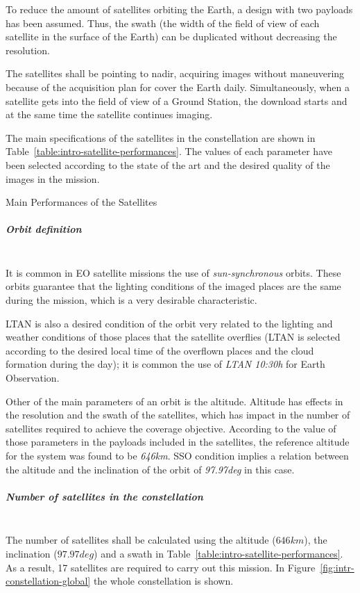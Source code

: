 To reduce the amount of satellites orbiting the Earth, a design with two payloads has been assumed. Thus, the swath (the width of the field of view of each satellite in the surface of the Earth) can be duplicated without decreasing the resolution.

The satellites shall be pointing to nadir, acquiring images without maneuvering because of the acquisition plan for cover the Earth daily. Simultaneously, when a satellite gets into the field of view of a Ground Station, the download starts and at the same time the satellite continues imaging.

The main specifications of the satellites in the constellation are shown in Table~\ref{table:intro-satellite-performances}. The values of each parameter have been selected according to the state of the art and the desired quality of the images in the mission.

\begin{table}[hp]
  \centering
  {\small
  
  }
  \caption{Main Performances of the Satellites}
  \label{table:intro-satellite-performances}
\end{table}


\subparagraph{Orbit definition}~\\
It is common in \acs{EO} satellite missions the use of \emph{sun-synchronous} orbits. These orbits guarantee that the lighting conditions of the imaged places are the same during the mission, which is a very desirable characteristic.

\acs{LTAN} is also a desired condition of the orbit very related to the lighting and weather conditions of those places that the satellite overflies (\acs{LTAN} is selected according to the desired local time of the overflown places and the cloud formation during the day); it is common the use of \emph{LTAN 10:30h} for Earth Observation.

Other of the main parameters of an orbit is the altitude. Altitude has effects in the resolution and the swath of the satellites, which has impact in the number of satellites required to achieve the coverage objective. According to the value of those parameters in the payloads included in the satellites, the reference altitude for the system was found to be \emph{646km}. \acs{SSO} condition implies a relation between the altitude and the inclination of the orbit of \emph{97.97deg} in this case.

\subparagraph{Number of satellites in the constellation}~\\
The number of satellites shall be calculated using the altitude ($646 km$), the
inclination ($97.97 deg$) and a swath in
Table~\ref{table:intro-satellite-performances}. As a result, 17 satellites are
required to carry out this mission. In Figure~\ref{fig:intr-constellation-global} the whole constellation is
shown.

